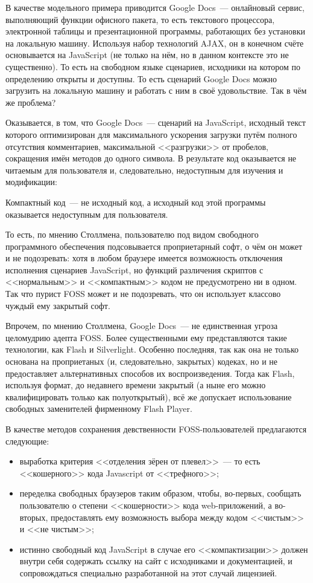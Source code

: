В качестве модельного примера приводится Google Docs~--- онлайновый сервис, выполняющий функции офисного пакета, то есть текстового процессора, электронной таблицы и презентационной программы, работающих без установки на локальную машину. Используя набор технологий AJAX, он в конечном счёте основывается на JavaScript (не только на нём, но в данном контексте это не существенно). То есть на свободном языке сценариев, исходники на котором по определению открыты и доступны. То есть сценарий Google Docs можно загрузить на локальную машину и работать с ним в своё удовольствие. Так в чём же проблема?

Оказывается, в том, что Google Docs~--- сценарий на JavaScript, исходный текст которого оптимизирован для максимального ускорения загрузки путём полного отсутствия комментариев, максимальной <<разгрузки>> от пробелов, сокращения имён методов до одного символа. В результате код оказывается не читаемым для пользователя и, следовательно, недоступным для изучения и модификации:


\begin{shadequote}{}Компактный код~--- не исходный код, а исходный код этой программы оказывается недоступным для пользователя.\end{shadequote}

То есть, по мнению Столлмена, пользователю под видом свободного программного обеспечения подсовывается проприетарный софт, о чём он может и не подозревать: хотя в любом браузере имеется возможность отключения исполнения сценариев JavaScript, но функций различения скриптов с <<нормальным>> и <<компактным>> кодом не предусмотрено ни в одном. Так что пурист FOSS может и не подозревать, что он использует классово чуждый ему закрытый софт.

Впрочем, по мнению Столлмена, Google Docs~--- не единственная угроза целомудрию адепта FOSS. Более существенными ему представляются такие технологии, как Flash и Silverlight. Особенно последняя, так как она не только основана на проприетаных (и, следовательно, закрытых) кодеках, но и не предоставляет альтернативных способов их воспроизведения. Тогда как Flash, используя формат, до недавнего времени закрытый (а ныне его можно квалифицировать только как полуоткрытый), всё же допускает использование свободных заменителей фирменному Flash Player.

В качестве методов сохранения девственности FOSS-пользователей предлагаются следующие:

\begin{itemize}
	\item выработка критерия <<отделения зёрен от плевел>>~--- то есть <<кошерного>> кода Javascript от <<трефного>>; 
	\item переделка свободных браузеров таким образом, чтобы, во-первых, сообщать пользователю о степени <<кошерности>> кода web-приложений, а во-вторых, предоставлять ему возможность выбора между кодом <<чистым>> и <<не чистым>>; 
	\item истинно свободный код JavaScript в случае его <<компактизации>> должен внутри себя содержать ссылку на сайт с исходниками и документацией, и сопровождаться специально разработанной на этот случай лицензией. 
\end{itemize}

